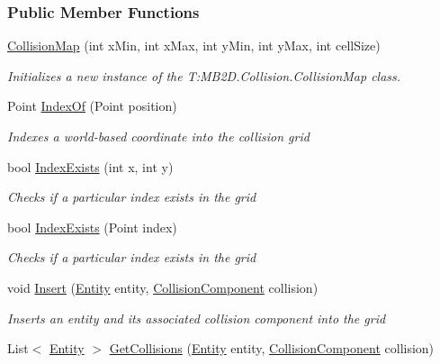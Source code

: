 \subsubsection*{Public Member Functions}
\begin{DoxyCompactItemize}
\item 
\hyperlink{class_m_b2_d_1_1_collision_1_1_collision_map_a715fbf658eed15c6f54a38a9bbb0cc82}{Collision\+Map} (int x\+Min, int x\+Max, int y\+Min, int y\+Max, int cell\+Size)
\begin{DoxyCompactList}\small\item\em Initializes a new instance of the T\+:\+M\+B2\+D.\+Collision.\+Collision\+Map class. \end{DoxyCompactList}\item 
Point \hyperlink{class_m_b2_d_1_1_collision_1_1_collision_map_a738f7b15771993a037044aace6a6e09b}{Index\+Of} (Point position)
\begin{DoxyCompactList}\small\item\em Indexes a world-\/based coordinate into the collision grid \end{DoxyCompactList}\item 
bool \hyperlink{class_m_b2_d_1_1_collision_1_1_collision_map_adb3b318fb729bd02cda21a450e504465}{Index\+Exists} (int x, int y)
\begin{DoxyCompactList}\small\item\em Checks if a particular index exists in the grid \end{DoxyCompactList}\item 
bool \hyperlink{class_m_b2_d_1_1_collision_1_1_collision_map_aa90ce934e081513f78aceacab50f27da}{Index\+Exists} (Point index)
\begin{DoxyCompactList}\small\item\em Checks if a particular index exists in the grid \end{DoxyCompactList}\item 
void \hyperlink{class_m_b2_d_1_1_collision_1_1_collision_map_a7d53571c049d50d62e6132413fe712e3}{Insert} (\hyperlink{class_m_b2_d_1_1_entity_component_1_1_entity}{Entity} entity, \hyperlink{class_m_b2_d_1_1_entity_component_1_1_collision_component}{Collision\+Component} collision)
\begin{DoxyCompactList}\small\item\em Inserts an entity and its associated collision component into the grid \end{DoxyCompactList}\item 
List$<$ \hyperlink{class_m_b2_d_1_1_entity_component_1_1_entity}{Entity} $>$ \hyperlink{class_m_b2_d_1_1_collision_1_1_collision_map_acbc6d9d9bb85342cf8f07c22f6947b27}{Get\+Collisions} (\hyperlink{class_m_b2_d_1_1_entity_component_1_1_entity}{Entity} entity, \hyperlink{class_m_b2_d_1_1_entity_component_1_1_collision_component}{Collision\+Component} collision)

\end{DoxyCompactItemize}
